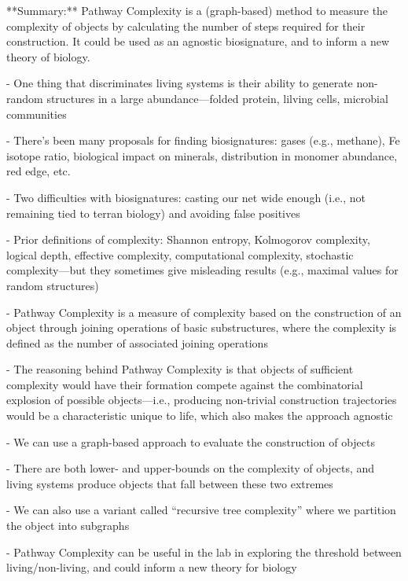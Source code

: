 \documentclass[11pt]{article}
\begin{document}
\begin{markdown}

**Summary:** Pathway Complexity is a (graph-based) method to measure the complexity of objects by calculating the number of steps required for their construction. It could be used as an agnostic biosignature, and to inform a new theory of biology.

- One thing that discriminates living systems is their ability to generate non-random structures in a large abundance—folded protein, lilving cells, microbial communities
    
- There’s been many proposals for finding biosignatures: gases (e.g., methane), Fe isotope ratio, biological impact on minerals, distribution in monomer abundance, red edge, etc.
    
- Two difficulties with biosignatures: casting our net wide enough (i.e., not remaining tied to terran biology) and avoiding false positives
    
- Prior definitions of complexity: Shannon entropy, Kolmogorov complexity, logical depth, effective complexity, computational complexity, stochastic complexity—but they sometimes give misleading results (e.g., maximal values for random structures)
    
- Pathway Complexity is a measure of complexity based on the construction of an object through joining operations of basic substructures, where the complexity is defined as the number of associated joining operations
    
- The reasoning behind Pathway Complexity is that objects of sufficient complexity would have their formation compete against the combinatorial explosion of possible objects—i.e., producing non-trivial construction trajectories would be a characteristic unique to life, which also makes the approach agnostic
    
- We can use a graph-based approach to evaluate the construction of objects
    
- There are both lower- and upper-bounds on the complexity of objects, and living systems produce objects that fall between these two extremes
    
- We can also use a variant called “recursive tree complexity” where we partition the object into subgraphs
    
- Pathway Complexity can be useful in the lab in exploring the threshold between living/non-living, and could inform a new theory for biology
    
\end{markdown}
\end{document}
